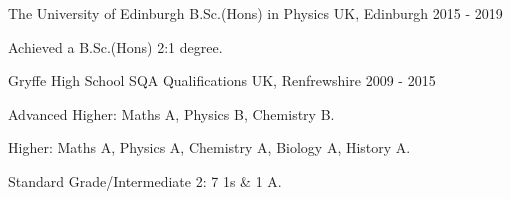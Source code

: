 



\begin{cventries}

  \cventry
    {The University of Edinburgh} %
    {B.Sc.(Hons) in Physics} %
    {UK, Edinburgh} %
    {2015 - 2019} %
    {
      \begin{cvitems} %
        \item{Achieved a B.Sc.(Hons) 2:1 degree.}
      \end{cvitems}
    }
    
  \cventry
    {Gryffe High School} %
    {SQA Qualifications} %
    {UK, Renfrewshire} %
    {2009 - 2015} %
    {
      \begin{cvitems} %
        \item {Advanced Higher: Maths A, Physics B, Chemistry B.}
        \item {Higher: Maths A, Physics A, Chemistry A, Biology A, History A.}
        \item {Standard Grade/Intermediate 2: 7 1s \& 1 A.}
      \end{cvitems}
    }

\end{cventries}